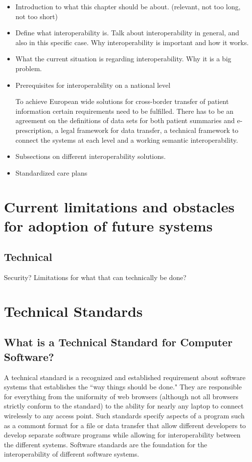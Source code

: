 \documentclass[12pt]{article}
\begin{document}
\begin{itemize}
\item Introduction to what this chapter should be about. (relevant, not too long, not too short)
\item Define what interoperability is. Talk about interoperability in general, and also in this specific case. Why interoperability is important and how it works.
\item What the current situation is regarding interoperability. Why it is a big problem.
\item Prerequisites for interoperability on a national level

To achieve European wide solutions for cross-border transfer of patient information certain requirements need to be fulfilled. There has to be an agreement on the definitions of data sets for both patient summaries and e-prescription, a legal framework for data transfer, a technical framework to connect the systems at each level and a working semantic interoperability. \cite{epSOS1}

\item Subsections on different interoperability solutions.
\item Standardized care plans
\end{itemize}


\section{Current limitations and obstacles for adoption of future systems}

\subsection{Technical}
Security? Limitations for what that can technically be done?




\section{Technical Standards}


\subsection{What is a Technical Standard for Computer Software?}
A technical standard is a recognized and established requirement about software systems that establishes the ``way things should be done." They are responsible for everything from the uniformity of web browsers (although not all browsers strictly conform to the standard) to the ability for nearly any laptop to connect wirelessly to any access point. Such standards specify aspects of a program such as a commont format for a file or data transfer that allow different developers to develop separate software programs while allowing for interoperability between the different systems. Software standards are the foundation for the interoperability of different software systems.
\end{document}
